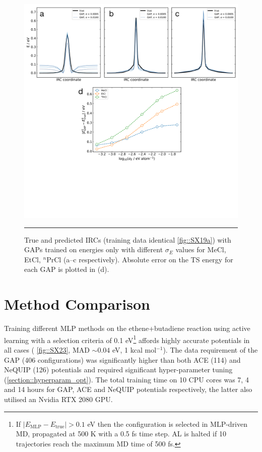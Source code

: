 \documentclass[11pt]{article}
\numberwithin{equation}{subsection}
\newcommand{\kcal}{kcal mol$^{-1}$}
\begin{document}
\begin{figure}[h!]
	\centering
	\includegraphics[width=\textwidth]{figSX19b.pdf}
	\vspace{0.0cm}
	\hrule
	\vspace{0.1cm}
	\caption{True and predicted IRCs (training data identical \figurename{ \ref{fig::SX19a}}) with GAPs trained on energies only with different $\sigma_E$ values for MeCl, EtCl, ${}^n$PrCl  (a--c respectively). Absolute error on the TS  energy for each GAP is plotted in (d).}
	\label{fig::SX19b}
\end{figure}


\clearpage
\section{Method Comparison}


Training different MLP methods on the ethene+butadiene reaction using active learning with a selection criteria of 0.1 eV\footnote{If $|E_\text{MLP} - E_\text{true}| > 0.1$ eV then the configuration is selected in MLP-driven MD, propagated at 500 K with a 0.5 fs time step. AL is halted if 10 trajectories reach the maximum MD time of 500 fs.} affords highly accurate potentials in all cases (\figurename{ \ref{fig::SX23}}, MAD $\sim 0.04$ eV, 1 \kcal). The data requirement of the GAP (406 configurations) was significantly higher than both ACE (114) and NeQUIP (126) potentials and required significant hyper-parameter tuning (\ref{section::hyperparam_opt}). The total training time on 10 CPU cores was 7, 4 and 14 hours for GAP, ACE and NeQUIP potentials respectively, the latter also utilised an Nvidia RTX 2080 GPU.
\end{document}
